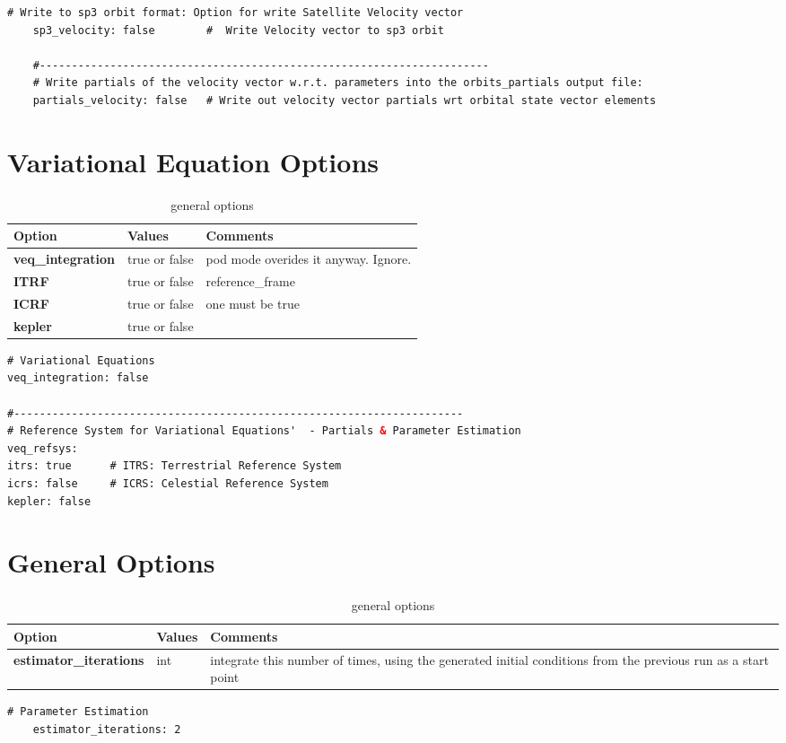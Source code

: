 {\small
	\begin{lstlisting}[language=xml,caption=yaml example for output file optionss]
	# Write to sp3 orbit format: Option for write Satellite Velocity vector
	sp3_velocity: false        #  Write Velocity vector to sp3 orbit
	
	#----------------------------------------------------------------------
	# Write partials of the velocity vector w.r.t. parameters into the orbits_partials output file:
	partials_velocity: false   # Write out velocity vector partials wrt orbital state vector elements
	\end{lstlisting}
}
\section{Variational Equation Options}
\begin{table}[h!]
	\begin{tabular}{|p{4.5cm}|p{2cm}|p{3.5cm}|}
		\hline
		Option & Values & Comments \\
		\hline
		\textbf{veq\_integration}& true or false &   pod mode overides it anyway. Ignore.\\
		\hline
		\textbf{ITRF} & true or false & reference\_frame\\
		\textbf{ICRF} & true or false &  one must be true\\   
		\textbf{kepler} & true or false & \\    
		\hline
	\end{tabular}
	\caption{general options}
	\label{table:label_name}
\end{table}
%
{\small
	\begin{lstlisting}[language=xml,caption=yaml example for variational equation options]
# Variational Equations
veq_integration: false

#----------------------------------------------------------------------
# Reference System for Variational Equations'  - Partials & Parameter Estimation
veq_refsys:
itrs: true      # ITRS: Terrestrial Reference System
icrs: false     # ICRS: Celestial Reference System
kepler: false
	\end{lstlisting}
}

\section{General Options}
\begin{table}[h!]
	\begin{tabular}{|p{4.5cm}|p{2cm}|p{3.5cm}|}
		\hline
		Option & Values & Comments \\
		\hline
        \textbf{estimator\_iterations} & int & integrate this number of times, using the generated initial conditions from the previous run as a start point\\   
        \hline
	\end{tabular}
	\caption{general options}
	\label{table:label_name}
\end{table}
%
{\small
\begin{lstlisting}[language=xml,caption=yaml example for output file options]
	# Parameter Estimation
	estimator_iterations: 2
\end{lstlisting}
}
%
%

